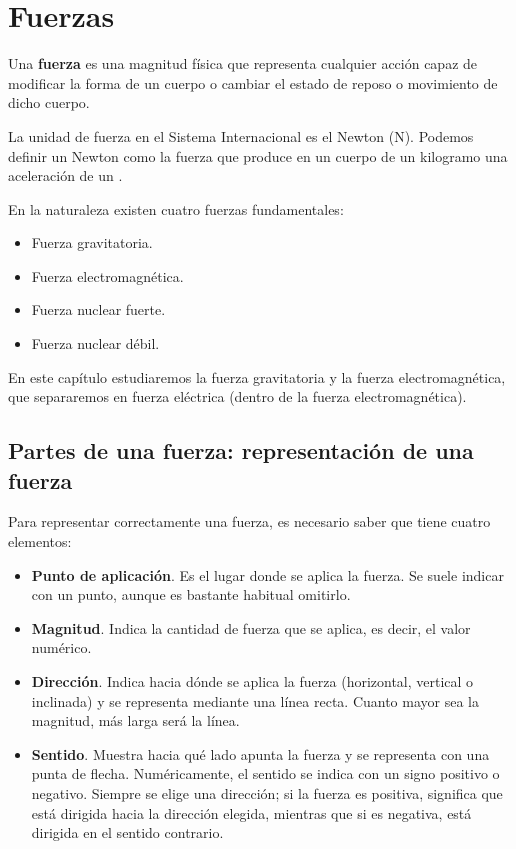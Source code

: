 



\section{Fuerzas}
\begin{definition}[Fuerza]
        Una \textbf{fuerza} es una magnitud física que representa cualquier acción capaz de modificar la forma de un cuerpo o cambiar el estado de reposo o movimiento de dicho cuerpo.
\end{definition}
La unidad de fuerza en el Sistema Internacional es el Newton (\unit{\newton}).
Podemos definir un Newton como la fuerza que produce en un cuerpo de un kilogramo una aceleración de un \unit{\mpss}.

En la naturaleza existen cuatro fuerzas fundamentales:
\begin{itemize}
    \item Fuerza gravitatoria.
    \item Fuerza electromagnética.
    \item Fuerza nuclear fuerte.
    \item Fuerza nuclear débil.
\end{itemize}

En este capítulo estudiaremos la fuerza gravitatoria y la fuerza electromagnética, que separaremos en fuerza eléctrica (dentro de la fuerza electromagnética).

\subsection{Partes de una fuerza: representación de una fuerza}

Para representar correctamente una fuerza, es necesario saber que tiene cuatro elementos:

\begin{itemize}
    \item \textbf{Punto de aplicación}.
    Es el lugar donde se aplica la fuerza.
    Se suele indicar con un punto, aunque es bastante habitual omitirlo.
    \item \textbf{Magnitud}.
    Indica la cantidad de fuerza que se aplica, es decir, el valor numérico.
    \item \textbf{Dirección}.
    Indica hacia dónde se aplica la fuerza (horizontal, vertical o inclinada) y se representa mediante una línea recta.
    Cuanto mayor sea la magnitud, más larga será la línea.
    \item \textbf{Sentido}.
    Muestra hacia qué lado apunta la fuerza y se representa con una punta de flecha.
    Numéricamente, el sentido se indica con un signo positivo o negativo.
    Siempre se elige una dirección; si la fuerza es positiva, significa que está dirigida hacia la dirección elegida, mientras que si es negativa, está dirigida en el sentido contrario.
\end{itemize}

